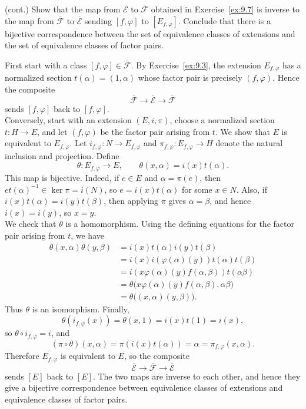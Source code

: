 \documentclass[../Odyssey_Project.tex]{subfiles}
\begin{document}
\begin{exercise}
\label{ex:9.8}
(cont.) Show that the map from $\overline{\mathcal{E}}$ to $\overline{\mathcal{F}}$ obtained in Exercise~\ref{ex:9.7} is inverse to the map from $\overline{\mathcal{F}}$ to $\overline{\mathcal{E}}$ sending $[f, \varphi]$ to $[E_{f, \varphi}]$. Conclude that there is a bijective correspondence between the set of equivalence classes of extensions and the set of equivalence classes of factor pairs.
\end{exercise}
\begin{solution}
First start with a class $[f,\varphi]\in\overline{\mathcal{F}}$. By Exercise~\ref{ex:9.3}, the extension $E_{f,\varphi}$ has a normalized section $t(\alpha)=(1,\alpha)$ whose factor pair is precisely $(f,\varphi)$. Hence the composite
\[
    \overline{\mathcal{F}}\to\overline{\mathcal{E}}\to\overline{\mathcal{F}}
\]
sends $[f,\varphi]$ back to $[f,\varphi]$.\\
Conversely, start with an extension $(E,i,\pi)$, choose a normalized section $t\colon H\to E$, and let $(f,\varphi)$ be the factor pair arising from $t$. We show that $E$ is equivalent to $E_{f,\varphi}$. Let $i_{f,\varphi}\colon N\to E_{f,\varphi}$ and $\pi_{f,\varphi}\colon E_{f,\varphi}\to H$ denote the natural inclusion and projection. Define
\[
    \theta\colon E_{f,\varphi}\to E,
    \qquad
    \theta(x,\alpha)=i(x)t(\alpha).
\]
This map is bijective. Indeed, if $e\in E$ and $\alpha=\pi(e)$, then $et(\alpha)^{-1}\in\ker\pi=i(N)$, so $e=i(x)t(\alpha)$ for some $x\in N$. Also, if $i(x)t(\alpha)=i(y)t(\beta)$, then applying $\pi$ gives $\alpha=\beta$, and hence $i(x)=i(y)$, so $x=y$.\\
We check that $\theta$ is a homomorphism. Using the defining equations for the factor pair arising from $t$, we have
\[
\begin{aligned}
    \theta(x,\alpha)\theta(y,\beta)
    &=
    i(x)t(\alpha)i(y)t(\beta)\\
    &=
    i(x)i(\varphi(\alpha)(y))t(\alpha)t(\beta)\\
    &=
    i(x\varphi(\alpha)(y)f(\alpha,\beta))t(\alpha\beta)\\
    &=
    \theta\bigl(x\varphi(\alpha)(y)f(\alpha,\beta),\alpha\beta\bigr)\\
    &=
    \theta\bigl((x,\alpha)(y,\beta)\bigr).
\end{aligned}
\]
Thus $\theta$ is an isomorphism. Finally,
\[
    \theta(i_{f,\varphi}(x))=\theta(x,1)=i(x)t(1)=i(x),
\]
so $\theta\circ i_{f,\varphi}=i$, and
\[
    (\pi\circ\theta)(x,\alpha)=\pi(i(x)t(\alpha))=\alpha=\pi_{f,\varphi}(x,\alpha).
\]
Therefore $E_{f,\varphi}$ is equivalent to $E$, so the composite
\[
    \overline{\mathcal{E}}\to\overline{\mathcal{F}}\to\overline{\mathcal{E}}
\]
sends $[E]$ back to $[E]$. The two maps are inverse to each other, and hence they give a bijective correspondence between equivalence classes of extensions and equivalence classes of factor pairs.
\end{solution}
\end{document}

